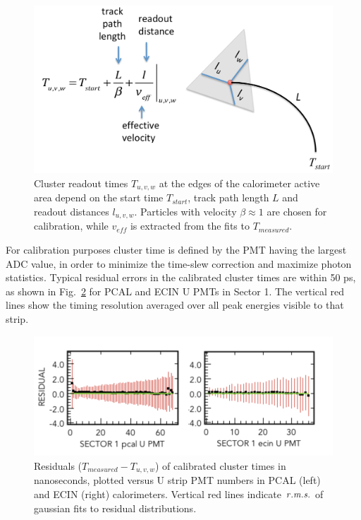 \begin{figure}[hbt]
\centering
\includegraphics[width=1.0\columnwidth,keepaspectratio]{img/S9_2_0.png}
\caption[]{Cluster readout times $T_{u,v,w}$ at the edges of the calorimeter active area depend on the start time $T_{start}$, track path length $L$ and readout distances $l_{u,v,w}$.  Particles with velocity $\beta\approx 1$ are chosen for calibration, while $v_{eff}$ is extracted from the fits to $T_{measured}$.}
\label{fig:S9_2_0}
\end{figure}

For calibration purposes cluster time is defined by the PMT having the largest ADC value, in order to minimize the time-slew correction and maximize photon statistics.  Typical residual errors in the calibrated cluster times are within 50 ps, as shown in Fig.~\ref{fig:S9_2_1} for PCAL and ECIN U PMTs in Sector 1.  The vertical red lines show 
the timing resolution averaged over all peak energies visible to that strip.  

\begin{figure}[hbt]
\centering
\includegraphics[width=1.0\columnwidth,keepaspectratio]{img/S9_2_1.png}
\caption[]{Residuals ($T_{measured}-T_{u,v,w}$) of calibrated cluster times in nanoseconds, plotted versus U strip PMT numbers in PCAL (left) and ECIN (right) calorimeters.  Vertical red lines indicate $\it{r.m.s.}$ of gaussian fits to residual distributions.}  
\label{fig:S9_2_1}
\end{figure}

